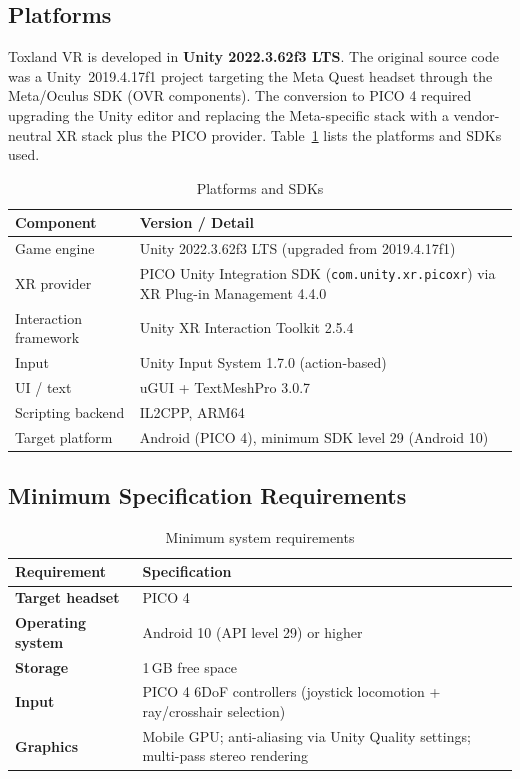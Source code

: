 \documentclass[a4paper,12pt]{article}
\begin{document}
\subsection{Platforms}

Toxland VR is developed in \textbf{Unity 2022.3.62f3 LTS}. The original source code was a Unity~2019.4.17f1 project targeting the Meta Quest headset through the Meta/Oculus SDK (OVR components). The conversion to PICO 4 required upgrading the Unity editor and replacing the Meta-specific stack with a vendor-neutral XR stack plus the PICO provider. Table~\ref{tab:platforms} lists the platforms and SDKs used.

\begin{table}[H]
\centering
\caption{Platforms and SDKs}
\label{tab:platforms}
\renewcommand{\arraystretch}{1.35}
\begin{tabularx}{\textwidth}{|>{\raggedright\arraybackslash}p{6cm}|X|}
\hline
\textbf{Component} & \textbf{Version / Detail} \\
\hline
Game engine & Unity 2022.3.62f3 LTS (upgraded from 2019.4.17f1) \\
\hline
XR provider & PICO Unity Integration SDK (\texttt{com.unity.xr.picoxr}) via XR Plug-in Management 4.4.0~\cite{picoxr2024} \\
\hline
Interaction framework & Unity XR Interaction Toolkit 2.5.4~\cite{unityxri2024} \\
\hline
Input & Unity Input System 1.7.0 (action-based) \\
\hline
UI / text & uGUI + TextMeshPro 3.0.7 \\
\hline
Scripting backend & IL2CPP, ARM64 \\
\hline
Target platform & Android (PICO 4), minimum SDK level 29 (Android 10) \\
\hline
\end{tabularx}
\end{table}

\subsection{Minimum Specification Requirements}

\begin{table}[H]
\centering
\caption{Minimum system requirements}
\label{tab:min-specs}
\renewcommand{\arraystretch}{1.35}
\begin{tabularx}{\textwidth}{|>{\bfseries}p{4.5cm}|X|}
\hline
\textbf{Requirement} & \textbf{Specification} \\
\hline
Target headset & PICO 4 \\
\hline
Operating system & Android 10 (API level 29) or higher \\
\hline
Storage & 1\,GB free space \\
\hline
Input & PICO 4 6DoF controllers (joystick locomotion + ray/crosshair selection) \\
\hline
Graphics & Mobile GPU; anti-aliasing via Unity Quality settings; multi-pass stereo rendering \\
\hline
\end{tabularx}
\end{table}
\end{document}

